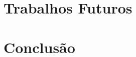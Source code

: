 \documentclass[conference]{IEEEtran}
\begin{document}
%



\section{Trabalhos Futuros}

\section{Conclusão}
\blindtext





\end{document}
